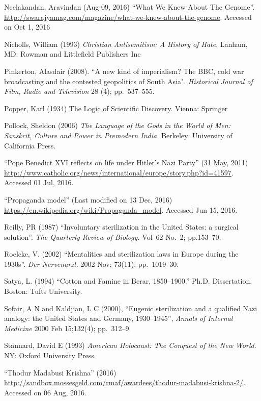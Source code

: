 \begin{thebibliography}{99}
Neelakandan, Aravindan (Aug 09, 2016) “What We Knew About The Genome”. \url{http://swarajyamag.com/magazine/what-we-knew-about-the-genome}. 
Accessed on Oct 1, 2016

Nicholls, William (1993) {\sl Christian Antisemitism: A History of Hate}. Lanham, MD: Rowman and Littlefield Publishers Inc

Pinkerton, Alasdair (2008). “A new kind of imperialism? The BBC, cold war broadcasting and the contested geopolitics of South Asia". {\sl Historical Journal of Film, Radio and Television} 28 (4); pp.~537--555.

Popper, Karl (1934) The Logic of Scientific Discovery. Vienna: Springer

Pollock, Sheldon (2006) {\sl The Language of the Gods in the World of Men: Sanskrit, Culture and Power in Premodern India.} Berkeley: University of California Press.

“Pope Benedict XVI reflects on life under Hitler's Nazi Party” (31 May, 2011)  \url{http://www.catholic.org/news/international/europe/story.php?id=41597}. Accessed 01 Jul, 2016.

“Propaganda model” (Last modified on 13 Dec, 2016) \url{https://en.wikipedia.org/wiki/Propaganda\_model}. Accessed Jun 15, 2016.

Reilly, PR (1987) “Involuntary sterilization in the United States: a surgical solution”. {\sl The Quarterly Review of Biology.} Vol~62 No.~2; pp.153--70. 

Roelcke, V. (2002) “Mentalities and sterilization laws in Europe during the 1930s”. {\sl Der Nervenarzt.} 2002 Nov; 73(11); pp.~1019--30.

Satya, L. (1994) “Cotton and Famine in Berar, 1850--1900.” Ph.D. Dissertation, Boston: Tufts University.

Sofair, A N and Kaldjian, L C (2000), “Eugenic sterilization and a qualified Nazi analogy: the United States and Germany, 1930--1945”, {\sl Annals of Internal Medicine} 2000 Feb 15;132(4); pp.~312--9. 

Stannard, David E (1993) {\sl American Holocaust: The Conquest of the New World}. NY: Oxford University Press.

“Thodur Madabusi Krishna” (2016) \url{http://sandbox.mossesgeld.com/rmaf/awardees/thodur-madabusi-krishna-2/}.\\ Accessed on 06 Aug, 2016.


\end{thebibliography}
